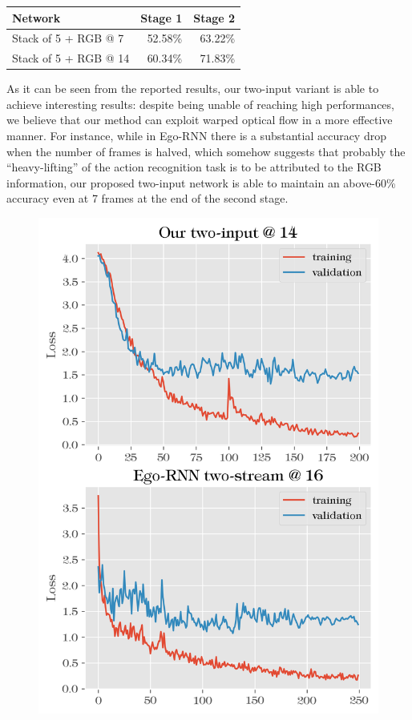 \documentclass[10pt,twocolumn,letterpaper]{article}
\begin{document}
\vspace{12pt} \noindent
\begin{tabular}{l|rr}
	Network & Stage 1 & Stage 2 \\
	\hline
	Stack of 5 + RGB @ 7 & 52.58\% & 63.22\% \\
    Stack of 5 + RGB @ 14 & 60.34\% & 71.83\% \\
\end{tabular} \vspace{6pt}

As it can be seen from the reported results, our two-input variant is able to achieve interesting results: despite being unable of reaching high performances, we believe that our method can exploit warped optical flow in a more effective manner. For instance, while in Ego-RNN there is a substantial accuracy drop when the number of frames is halved, which somehow suggests that probably the ``heavy-lifting'' of the action recognition task is to be attributed to the RGB information, our proposed two-input network is able to maintain an above-60\% accuracy even at 7 frames at the end of the second stage.

\begin{figure}[h!]
	\begin{center}
		\includegraphics[width=\linewidth]{grafici/losses.png}		
	\end{center}
	\caption{}
	\label{fig:losses}
\end{figure}
\end{document}
